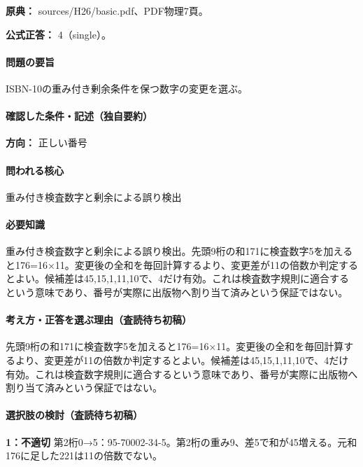 \noindent\textbf{原典：} sources/H26/basic.pdf、PDF物理7頁。

\textbf{公式正答：} 4（single）。

\paragraph{問題の要旨} ISBN-10の重み付き剰余条件を保つ数字の変更を選ぶ。

\paragraph{確認した条件・記述（独自要約）}\mbox{}\par

\noindent\textbf{方向：} 正しい番号\par

\paragraph{問われる核心} 重み付き検査数字と剰余による誤り検出

\paragraph{必要知識} 重み付き検査数字と剰余による誤り検出。先頭9桁の和171に検査数字5を加えると176=\allowbreak{}16×11。変更後の全和を毎回計算するより、変更差が11の倍数か判定するとよい。候補差は45,15,1,11,10で、4だけ有効。これは検査数字規則に適合するという意味であり、番号が実際に出版物へ割り当て済みという保証ではない。

\paragraph{考え方・正答を選ぶ理由（査読待ち初稿）} 先頭9桁の和171に検査数字5を加えると176=\allowbreak{}16×11。変更後の全和を毎回計算するより、変更差が11の倍数か判定するとよい。候補差は45,15,1,11,10で、4だけ有効。これは検査数字規則に適合するという意味であり、番号が実際に出版物へ割り当て済みという保証ではない。

\paragraph{選択肢の検討（査読待ち初稿）}\mbox{}\par

\noindent\textbf{1：不適切} 第2桁0→5：95-70002-34-5。第2桁の重み9、差5で和が45増える。元和176に足した221は11の倍数でない。\par

